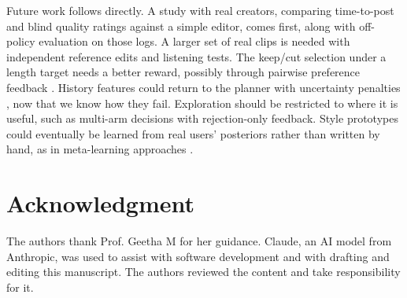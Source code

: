 \documentclass{ieeeaccess}
\begin{document}
Future work follows directly. A study with real creators, comparing time-to-post and blind quality ratings against a simple editor, comes first, along with off-policy evaluation on those logs. A larger set of real clips is needed with independent reference edits and listening tests. The keep/cut selection under a length target needs a better reward, possibly through pairwise preference feedback \cite{christiano2017}. History features could return to the planner with uncertainty penalties \cite{yu2020}, now that we know how they fail. Exploration should be restricted to where it is useful, such as multi-arm decisions with rejection-only feedback. Style prototypes could eventually be learned from real users' posteriors rather than written by hand, as in meta-learning approaches \cite{kveton2021meta,cella2020meta}.

\section*{Acknowledgment}
The authors thank Prof. Geetha M for her guidance. Claude, an AI model from Anthropic, was used to assist with software development and with drafting and editing this manuscript. The authors reviewed the content and take responsibility for it.
\end{document}
